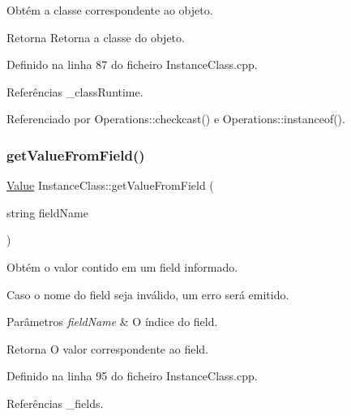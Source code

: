 Obtém a classe correspondente ao objeto. 

\begin{DoxyReturn}{Retorna}
Retorna a classe do objeto. 
\end{DoxyReturn}


Definido na linha 87 do ficheiro Instance\+Class.\+cpp.



Referências \+\_\+class\+Runtime.



Referenciado por Operations\+::checkcast() e Operations\+::instanceof().

\mbox{\label{classInstanceClass_aee974c71919d470ea2e9aa75cf741a39}} 
\subsubsection{\texorpdfstring{get\+Value\+From\+Field()}{getValueFromField()}}
{\footnotesize\ttfamily \hyperlink{structValue}{Value} Instance\+Class\+::get\+Value\+From\+Field (\begin{DoxyParamCaption}\item[{string}]{field\+Name }\end{DoxyParamCaption})}



Obtém o valor contido em um field informado. 

Caso o nome do field seja inválido, um erro será emitido. 
\begin{DoxyParams}{Parâmetros}
{\em field\+Name} & O índice do field. \\
\hline
\end{DoxyParams}
\begin{DoxyReturn}{Retorna}
O valor correspondente ao field. 
\end{DoxyReturn}


Definido na linha 95 do ficheiro Instance\+Class.\+cpp.



Referências \+\_\+fields.

\mbox{\label{classInstanceClass_ae8570307f49cb95cc01fb8d6bda23763}} 
